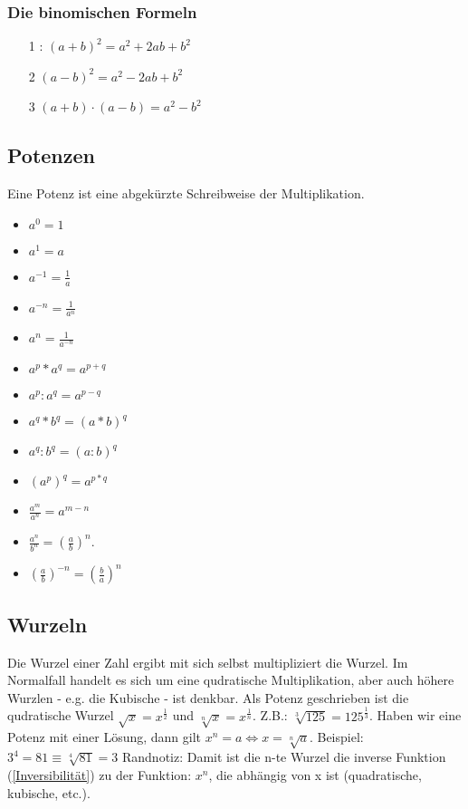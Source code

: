 \documentclass[letterpaper, titlepage]{article}
\begin{document}
\subsubsection{Die binomischen Formeln}
\begin{enumerate}
    \item[1]: $(a+b)^2=a^2+2ab+b^2$
    \item[2] $(a-b)^2=a^2-2ab+b^2$
    \item[3]  $(a+b)\cdot(a-b)=a^2-b^2$
\end{enumerate}

\subsection{Potenzen}\label{Potenzen}
Eine Potenz ist eine abgekürzte Schreibweise der Multiplikation.
\begin{itemize}
    \item $a^0=1$
    \item $a^1=a$
    \item $a^{-1}=\frac{1}{a}$ 
    \item $a^{-n}=\frac{1}{a^n}$
    \item $a^n=\frac{1}{a^{-n}}$
    \item $a^p * a^q = a^{p+q}$
    \item $a^p : a^q = a^{p-q}$
    \item $a^q * b^q = (a * b)^q$
    \item $a^q : b^q = (a : b)^q$
    \item $(a^p)^q = a^{p*q}$
    \item $\frac{a^m}{a^n}=a^{m-n}$
    \item $\frac{a^n}{b^n}=(\frac{a}{b})^n$.
    \item $(\frac{a}{b})^{-n}=(\frac{b}{a})^n$ 
\end{itemize}

\subsection{Wurzeln}\label{Wurzeln}
Die Wurzel einer Zahl ergibt mit sich selbst multipliziert die Wurzel. Im Normalfall handelt es sich um eine qudratische Multiplikation, aber auch höhere Wurzlen - e.g. die Kubische - ist denkbar. Als Potenz geschrieben ist die qudratische Wurzel $\sqrt{x}=x^{\frac{1}{2}}$ und $\sqrt[n]{x}=x^{\frac{1}{n}}$. Z.B.: $\sqrt[3]{125} = 125^{\frac{1}{3}}$.
Haben wir eine Potenz mit einer Lösung, dann gilt $x^n=a \Leftrightarrow x=\sqrt[n]{a}$.
\skiptwolines
Beispiel: $3^4 = 81 \equiv \sqrt[4]{81} = 3$
\skiptwolines
Randnotiz: Damit ist die n-te Wurzel die inverse Funktion (\ref{Inversibilität}) zu der Funktion: $x^n$, die abhängig von x ist (quadratische, kubische, etc.).
\end{document}
